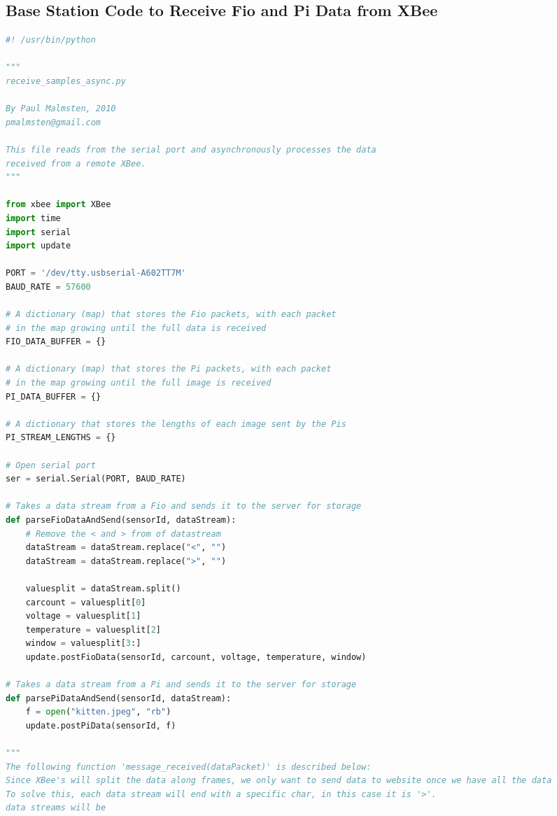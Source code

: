 \documentclass[11pt, oneside, fullpage, doublespace]{article}
\begin{document}
\subsection*{Base Station Code to Receive Fio and Pi Data from XBee}
\begin{spacing}{1}
\begin{lstlisting}[language=python]
#! /usr/bin/python

"""
receive_samples_async.py

By Paul Malmsten, 2010
pmalmsten@gmail.com

This file reads from the serial port and asynchronously processes the data
received from a remote XBee.
"""

from xbee import XBee
import time
import serial
import update

PORT = '/dev/tty.usbserial-A602TT7M'
BAUD_RATE = 57600

# A dictionary (map) that stores the Fio packets, with each packet 
# in the map growing until the full data is received
FIO_DATA_BUFFER = {}

# A dictionary (map) that stores the Pi packets, with each packet 
# in the map growing until the full image is received
PI_DATA_BUFFER = {}

# A dictionary that stores the lengths of each image sent by the Pis
PI_STREAM_LENGTHS = {}

# Open serial port
ser = serial.Serial(PORT, BAUD_RATE)

# Takes a data stream from a Fio and sends it to the server for storage
def parseFioDataAndSend(sensorId, dataStream):
	# Remove the < and > from of datastream
	dataStream = dataStream.replace("<", "")
	dataStream = dataStream.replace(">", "")

	valuesplit = dataStream.split()
	carcount = valuesplit[0]
	voltage = valuesplit[1]
	temperature = valuesplit[2]
	window = valuesplit[3:]
	update.postFioData(sensorId, carcount, voltage, temperature, window)

# Takes a data stream from a Pi and sends it to the server for storage
def parsePiDataAndSend(sensorId, dataStream):
	f = open("kitten.jpeg", "rb")
	update.postPiData(sensorId, f)

"""
The following function 'message_received(dataPacket)' is described below:
Since XBee's will split the data along frames, we only want to send data to website once we have all the data
To solve this, each data stream will end with a specific char, in this case it is '>'. 
data streams will be 


\end{lstlisting}
\end{spacing}
\end{document}
